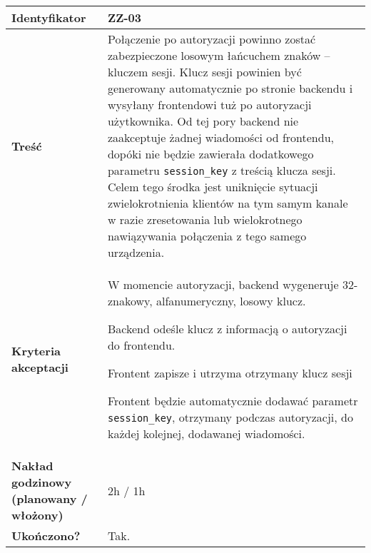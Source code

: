 \begin{tabular}{ | l | l | }
	\hline
		\textbf{Identyfikator} &
		ZZ-03
		\\

	\hline
		\textbf{Treść} & \parbox[t]{11.5cm}{\strut
			Połączenie po autoryzacji powinno zostać zabezpieczone losowym łańcuchem
      znaków -- kluczem sesji. Klucz sesji powinien być generowany
      automatycznie po stronie backendu i wysyłany frontendowi tuż po
      autoryzacji użytkownika. Od tej pory backend nie zaakceptuje żadnej
      wiadomości od frontendu, dopóki nie
      będzie zawierała dodatkowego parametru \texttt{session\_key} z treścią
      klucza sesji. Celem tego środka jest uniknięcie sytuacji zwielokrotnienia
      klientów na tym samym kanale w razie zresetowania lub wielokrotnego
      nawiązywania połączenia z tego samego urządzenia.
		\strut}\\

	\hline
		\parbox[t]{4cm}{\textbf{Kryteria akceptacji}} & \parbox[t]{11.5cm}{\strut
			\begin{enumreq}
				\item W momencie autoryzacji, backend wygeneruje 32-znakowy,
        alfanumeryczny, losowy klucz.
        \item Backend odeśle klucz z informacją o autoryzacji do frontendu.
        \item Frontent zapisze i utrzyma otrzymany klucz sesji
        \item Frontent będzie automatycznie dodawać parametr \texttt{session\_key},
        otrzymany podczas autoryzacji, do każdej kolejnej, dodawanej wiadomości.
			\end{enumreq}
			\strut}
		\\

    \hline
  		\parbox[t]{4cm}{\textbf{Nakład godzinowy (planowany / włożony)}} &
      \parbox[t]{11.5cm}{\strut
  			2h / 1h
  		\strut}\\

        \hline
          \parbox[t]{4cm}{\textbf{Ukończono?}} &
          \parbox[t]{11.5cm}{\strut
            Tak.
          \strut}\\

          \hline
      \end{tabular}

      \vspace{1em}
